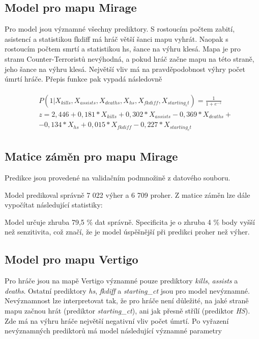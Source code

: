 \subsection{Model pro mapu Mirage}



Pro model jsou významné všechny prediktory. S rostoucím počtem zabití, asistencí a statistikou fkdiff má hráč větší šanci mapu vyhrát. Naopak s rostoucím počtem smrtí a 
statistikou hs, šance na výhru klesá. Mapa je pro stranu Counter-Terroristů nevýhodná, a pokud hráč začne mapu na této straně, jeho šance na výhru klesá. Největší vliv
má na pravděpodobnost výhry počet úmrtí hráče. Přepis funkce pak vypadá následovně

\begin{align}
    \begin{split}
        &P(1 | X_{kills}, X_{assists}, X_{deaths}, X_{hs}, X_{fkdiff}, X_{starting_ct}) = \frac{1}{1 + e^{-z}} \\
        &z = 2,446 + 0,181*X_{kills} + 0,302*X_{assists} - 0,369*X_{deaths} + \\
        &- 0,134*X_{hs} + 0,015*X_{fkdiff} - 0,227*X_{starting_ct}
    \end{split}
\end{align}

\subsection{Matice záměn pro mapu Mirage}
Predikce jsou provedené na validačním podmnožině z datového souboru.



Model predikoval správně 7 022 výher a 6 709 proher. Z matice záměn lze dále vypočítat následující statistiky:



Model určuje zhruba 79,5 \% dat správně. Specificita je o zhruba 4 \% body vyšší než senzitivita, což značí, že je model úspěšnější při predikci proher
než výher.

\subsection{Model pro mapu Vertigo}



Pro hráče jsou na mapě Vertigo významné pouze prediktory \textit{kills}, \textit{assists} a \textit{deaths}. Ostatní prediktory \textit{hs}, \textit{fkdiff} a \textit{starting\_ct}
jsou pro model nevýznamné. Nevýznamnost lze interpretovat tak, že pro hráče není důležité, na jaké straně mapu začnou hrát (prediktor  \textit{starting\_ct}), ani jak přesně
střílí (prediktor \textit{HS}). Zde má na výhru hráče největší negativní vliv počet úmrtí. Po vyřazení nevýznamných prediktorů má model následující významné parametry

